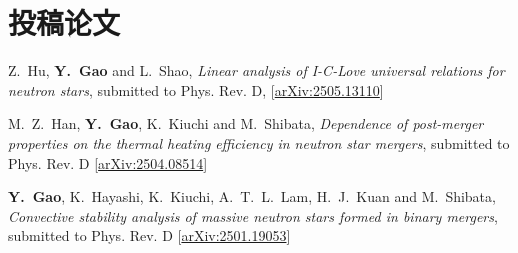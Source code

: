 \newcommand{\arxiv}[1]{[\href{http://arxiv.org/abs/#1}{arXiv:#1}]}
\newcommand{\citeCount}[1]{(#1 citations)}
\renewcommand{\citeCount}[1]{}


\setcounter{numPubs}{28}
\setcounter{pubCounter}{\value{numPubs}}

\section{ 投稿论文}
\begin{etaremune}[start=\value{pubCounter}]
  \item 
  Z.~Hu, {\bf Y.~Gao} and L.~Shao,
  {\it Linear analysis of I-C-Love universal relations for neutron stars},
  submitted to Phys. Rev. D,
  \arxiv{2505.13110}
  \item
  M.~Z.~Han, {\bf Y.~Gao}, K.~Kiuchi and M.~Shibata,
  {\it Dependence of post-merger properties on the thermal heating efficiency in neutron star mergers},
  submitted to Phys. Rev. D
  \arxiv{2504.08514}
  \item
  {\bf Y.~Gao}, K.~Hayashi, K.~Kiuchi, A.~T.~L.~Lam, H.~J.~Kuan and M.~Shibata,
  {\it Convective stability analysis of massive neutron stars formed in binary mergers},
  submitted to Phys. Rev. D
  \arxiv{2501.19053}
\end{etaremune}



